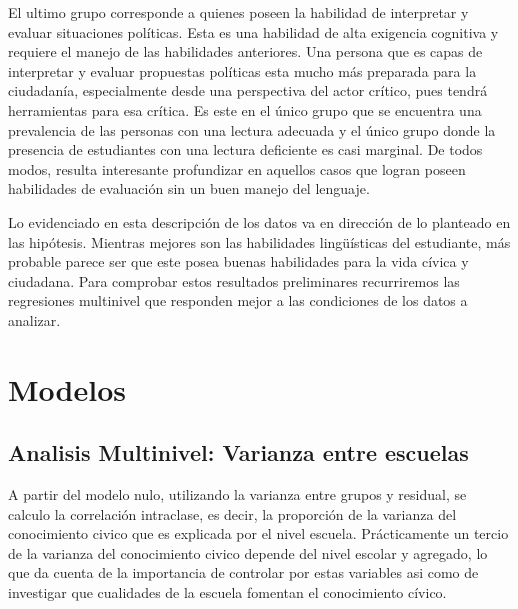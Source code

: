 \documentclass[12pt,twoside]{templates/facsothesis}
\begin{document}
El ultimo grupo corresponde a quienes poseen la habilidad de interpretar y evaluar situaciones políticas. Esta es una habilidad de alta exigencia cognitiva y requiere el manejo de las habilidades anteriores. Una persona que es capas de interpretar y evaluar propuestas políticas esta mucho más preparada para la ciudadanía, especialmente desde una perspectiva del actor crítico, pues tendrá herramientas para esa crítica. Es este en el único grupo que se encuentra una prevalencia de las personas con una lectura adecuada y el único grupo donde la presencia de estudiantes con una lectura deficiente es casi marginal. De todos modos, resulta interesante profundizar en aquellos casos que logran poseen habilidades de evaluación sin un buen manejo del lenguaje.

Lo evidenciado en esta descripción de los datos va en dirección de lo planteado en las hipótesis. Mientras mejores son las habilidades lingüísticas del estudiante, más probable parece ser que este posea buenas habilidades para la vida cívica y ciudadana. Para comprobar estos resultados preliminares recurriremos las regresiones multinivel que responden mejor a las condiciones de los datos a analizar.

\hypertarget{modelos}{%
\section{Modelos}\label{modelos}}

\hypertarget{analisis-multinivel-varianza-entre-escuelas}{%
\subsection{Analisis Multinivel: Varianza entre escuelas}\label{analisis-multinivel-varianza-entre-escuelas}}

A partir del modelo nulo, utilizando la varianza entre grupos y residual, se calculo la correlación intraclase, es decir, la proporción de la varianza del conocimiento civico que es explicada por el nivel escuela. Prácticamente un tercio de la varianza del conocimiento civico depende del nivel escolar y agregado, lo que da cuenta de la importancia de controlar por estas variables asi como de investigar que cualidades de la escuela fomentan el conocimiento cívico.
\end{document}
